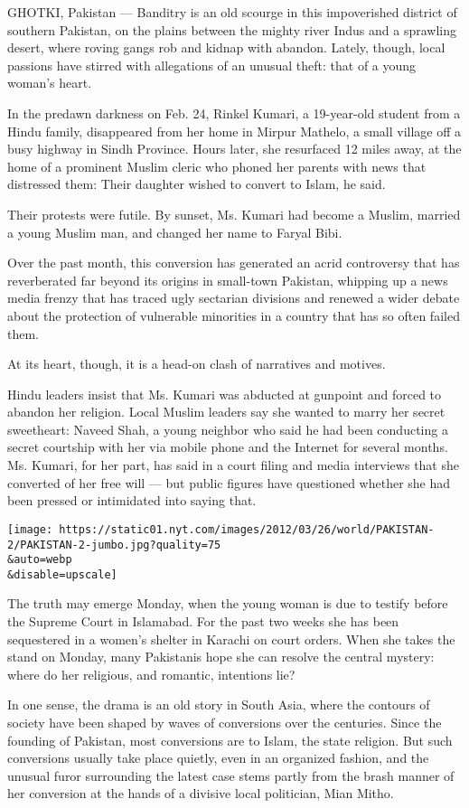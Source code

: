 GHOTKI, Pakistan --- Banditry is an old scourge in this impoverished
district of southern Pakistan, on the plains between the mighty river
Indus and a sprawling desert, where roving gangs rob and kidnap with
abandon. Lately, though, local passions have stirred with allegations of
an unusual theft: that of a young woman's heart.

In the predawn darkness on Feb. 24, Rinkel Kumari, a 19-year-old student
from a Hindu family, disappeared from her home in Mirpur Mathelo, a
small village off a busy highway in Sindh Province. Hours later, she
resurfaced 12 miles away, at the home of a prominent Muslim cleric who
phoned her parents with news that distressed them: Their daughter wished
to convert to Islam, he said.

Their protests were futile. By sunset, Ms. Kumari had become a Muslim,
married a young Muslim man, and changed her name to Faryal Bibi.

Over the past month, this conversion has generated an acrid controversy
that has reverberated far beyond its origins in small-town Pakistan,
whipping up a news media frenzy that has traced ugly sectarian divisions
and renewed a wider debate about the protection of vulnerable minorities
in a country that has so often failed them.

At its heart, though, it is a head-on clash of narratives and motives.

Hindu leaders insist that Ms. Kumari was abducted at gunpoint and forced
to abandon her religion. Local Muslim leaders say she wanted to marry
her secret sweetheart: Naveed Shah, a young neighbor who said he had
been conducting a secret courtship with her via mobile phone and the
Internet for several months. Ms. Kumari, for her part, has said in a
court filing and media interviews that she converted of her free will
--- but public figures have questioned whether she had been pressed or
intimidated into saying that.

\texttt{[image: https://static01.nyt.com/images/2012/03/26/world/PAKISTAN-2/PAKISTAN-2-jumbo.jpg?quality=75\\\&auto=webp\\\&disable=upscale]}

The truth may emerge Monday, when the young woman is due to testify
before the Supreme Court in Islamabad. For the past two weeks she has
been sequestered in a women's shelter in Karachi on court orders. When
she takes the stand on Monday, many Pakistanis hope she can resolve the
central mystery: where do her religious, and romantic, intentions lie?

In one sense, the drama is an old story in South Asia, where the
contours of society have been shaped by waves of conversions over the
centuries. Since the founding of Pakistan, most conversions are to
Islam, the state religion. But such conversions usually take place
quietly, even in an organized fashion, and the unusual furor surrounding
the latest case stems partly from the brash manner of her conversion at
the hands of a divisive local politician, Mian Mitho.

